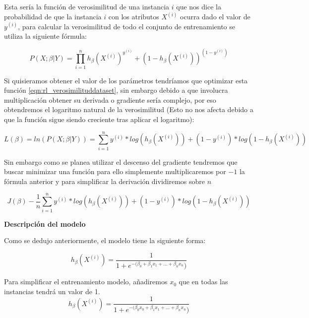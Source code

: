 \documentclass[11pt,fleqn]{book} %
\begin{document}
Esta sería la función de verosimilitud de una instancia $i$ que nos dice la probabilidad de que la instancia $i$ con los atributos $X^{(i)}$ ocurra dado el valor de $y^{(i)}$, para calcular la verosimilitud de todo el conjunto de entrenamiento se utiliza la siguiente fórmula:

\begin{equation}
P(X;\beta | Y) = \prod_{i=1}^{n} h_\beta(X^{(i)}) ^ {y^{(i)}} + (1-h_\beta(X^{(i)})) ^ {(1- y^{(i)})}
\label{eqn:rl_verosimilituddataset} 
\end{equation}

Si quisieramos obtener el valor de los parámetros tendríamos que optimizar esta función \ref{eqn:rl_verosimilituddataset}, sin embargo debido a que involucra multiplicación obtener su derivada o gradiente sería complejo, por eso obtendremos el logaritmo natural de la verosimilitud (Esto no nos afecta debido a que la función sigue siendo creciente tras aplicar el logaritmo):

\begin{equation}
L(\beta) = ln(P(X;\beta  | Y)) = \sum_{i=1}^{n} y^{(i)}*log(h_\beta(X^{(i)}) ) + (1-y^{(i)})*log(1-h_\beta(X^{(i)}) )
\label{eqn:rl_verosimilituddataset_log} 
\end{equation}

Sin embargo como se planea utilizar el descenso del gradiente tendremos que buscar minimizar una función para ello simplemente multiplicaremos por $-1$ la fórmula anterior y para simplificar la derivación dividiremos sobre $n$

\begin{equation}
J(\beta) -\frac{1}{n} \sum_{i=1}^{n} y^{(i)}*log(h_\beta(X^{(i)}) ) + (1-y^{(i)})*log(1-h_\beta(X^{(i)}) )
\label{eqn:rl_funcioncoste} 
\end{equation}

\textbf{Descripción del modelo}

Como se dedujo anteriormente, el modelo tiene la siguiente forma:

\begin{equation}
h_\beta(X^{(i)}) = \frac{1}{1+e^{-(\beta_0 + \beta_1 x_1 + ... + \beta_n x_n})} 
\label{eqn:suposicion_inicial_final2} 
\end{equation}

Para simplificar el entrenamiento modelo, añadiremos $x_0$ que en todas las instancias tendrá un valor de 1.
\begin{equation}
h_\beta(X^{(i)}) = \frac{1}{1+e^{-(\beta_0 x_0 + \beta_1 x_1 + ... + \beta_n x_n})} 
\label{eqn:suposicion_inicial_final3} 
\end{equation}
\end{document}
